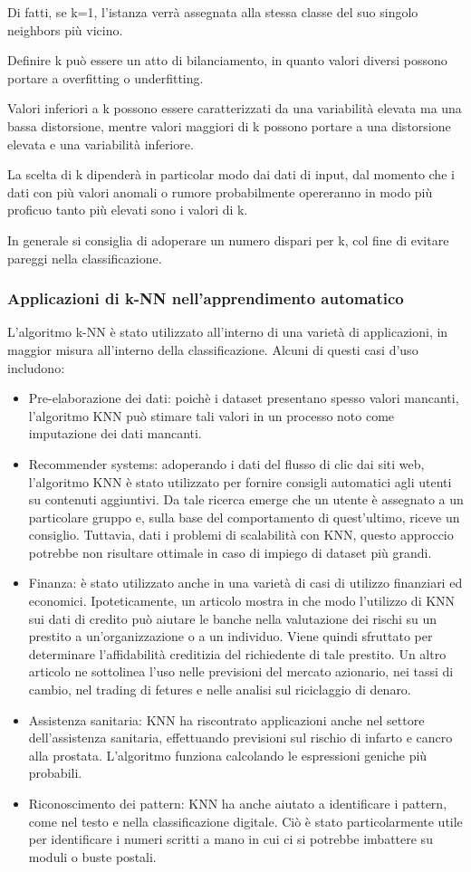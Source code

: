 Di fatti, se k=1, l'istanza verrà assegnata alla stessa classe del suo singolo neighbors più vicino. 

Definire k può essere un atto di bilanciamento, in quanto valori diversi possono portare a overfitting o underfitting. 

Valori inferiori a k possono essere caratterizzati da una variabilità elevata ma una bassa distorsione, mentre valori maggiori di k possono portare a una distorsione elevata e una variabilità inferiore. 

La scelta di k dipenderà in particolar modo dai dati di input, dal momento che i dati con più valori anomali o rumore probabilmente opereranno in modo più proficuo tanto più elevati sono i valori di k. 

In generale si consiglia di adoperare un numero dispari per k, col fine di evitare pareggi nella classificazione.

\subsubsection{Applicazioni di k-NN nell'apprendimento automatico}
L'algoritmo k-NN è stato utilizzato all'interno di una varietà di applicazioni, in maggior misura all'interno della classificazione. Alcuni di questi casi d'uso includono:
\begin{itemize}
\item Pre-elaborazione dei dati: poichè i dataset presentano spesso valori mancanti, l'algoritmo KNN può stimare tali valori in un processo noto come imputazione dei dati mancanti.
\item Recommender systems: adoperando i dati del flusso di clic dai siti web, l'algoritmo KNN è stato utilizzato per fornire consigli automatici agli utenti su contenuti aggiuntivi. Da tale ricerca emerge che un utente è assegnato a un particolare gruppo e, sulla base del comportamento di quest'ultimo, riceve un consiglio. Tuttavia, dati i problemi di scalabilità con KNN, questo approccio potrebbe non risultare ottimale in caso di impiego di dataset più grandi.
\item Finanza: è stato utilizzato anche in una varietà di casi di utilizzo finanziari ed economici. Ipoteticamente, un articolo mostra in che modo l'utilizzo di KNN sui dati di credito può aiutare le banche nella valutazione dei rischi su un prestito a un'organizzazione o a un individuo. Viene quindi sfruttato per determinare l'affidabilità creditizia del richiedente di tale prestito. Un altro articolo ne sottolinea l'uso nelle previsioni del mercato azionario, nei tassi di cambio, nel trading di fetures e nelle analisi sul riciclaggio di denaro.
\item Assistenza sanitaria: KNN ha riscontrato applicazioni anche nel settore dell'assistenza sanitaria, effettuando previsioni sul rischio di infarto e cancro alla prostata. L'algoritmo funziona calcolando le espressioni geniche più probabili.
\item Riconoscimento dei pattern: KNN ha anche aiutato a identificare i pattern, come nel testo e nella classificazione digitale. Ciò è stato particolarmente utile per identificare i numeri scritti a mano in cui ci si potrebbe imbattere su moduli o buste postali.
\end{itemize}
